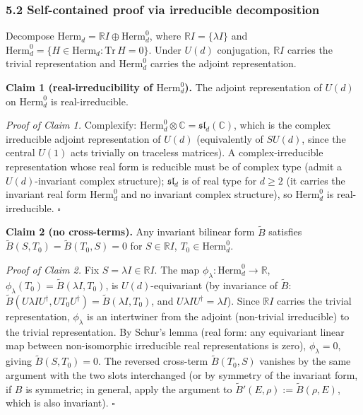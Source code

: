 \documentclass[
]{article}
\begin{document}
\subsubsection{5.2 Self-contained proof via irreducible
decomposition}\label{self-contained-proof-via-irreducible-decomposition}

Decompose \(\mathrm{Herm}_d=\mathbb RI\oplus\mathrm{Herm}_d^0\), where
\(\mathbb RI=\{\lambda I\}\) and
\(\mathrm{Herm}_d^0=\{H\in\mathrm{Herm}_d:\mathrm{Tr}\,H=0\}\). Under
\(U(d)\) conjugation, \(\mathbb RI\) carries the trivial representation
and \(\mathrm{Herm}_d^0\) carries the adjoint representation.

\textbf{Claim 1 (real-irreducibility of \(\mathrm{Herm}_d^0\)).} The
adjoint representation of \(U(d)\) on \(\mathrm{Herm}_d^0\) is
real-irreducible.

\emph{Proof of Claim 1.} Complexify:
\(\mathrm{Herm}_d^0\otimes\mathbb C=\mathfrak{sl}_d(\mathbb C)\), which
is the complex irreducible adjoint representation of \(U(d)\)
(equivalently of \(SU(d)\), since the central \(U(1)\) acts trivially on
traceless matrices). A complex-irreducible representation whose real
form is reducible must be of complex type (admit a \(U(d)\)-invariant
complex structure); \(\mathfrak{sl}_d\) is of real type for \(d\geq 2\)
(it carries the invariant real form \(\mathrm{Herm}_d^0\) and no
invariant complex structure), so \(\mathrm{Herm}_d^0\) is
real-irreducible. \(\square\)

\textbf{Claim 2 (no cross-terms).} Any invariant bilinear form
\(\widetilde B\) satisfies \(\widetilde B(S,T_0)=\widetilde B(T_0,S)=0\)
for \(S\in\mathbb RI\), \(T_0\in\mathrm{Herm}_d^0\).

\emph{Proof of Claim 2.} Fix \(S=\lambda I\in\mathbb RI\). The map
\(\phi_\lambda:\mathrm{Herm}_d^0\to\mathbb R\),
\(\phi_\lambda(T_0)=\widetilde B(\lambda I,T_0)\), is
\(U(d)\)-equivariant (by invariance of \(\widetilde B\):
\(\widetilde B(U\lambda IU^\dagger,UT_0U^\dagger)=\widetilde B(\lambda I,T_0)\),
and \(U\lambda IU^\dagger=\lambda I\)). Since \(\mathbb RI\) carries the
trivial representation, \(\phi_\lambda\) is an intertwiner from the
adjoint (non-trivial irreducible) to the trivial representation. By
Schur's lemma (real form: any equivariant linear map between
non-isomorphic irreducible real representations is zero),
\(\phi_\lambda=0\), giving \(\widetilde B(S,T_0)=0\). The reversed
cross-term \(\widetilde B(T_0,S)\) vanishes by the same argument with
the two slots interchanged (or by symmetry of the invariant form, if
\(B\) is symmetric; in general, apply the argument to
\(\widetilde B'(E,\rho):=\widetilde B(\rho,E)\), which is also
invariant). \(\square\)
\end{document}
